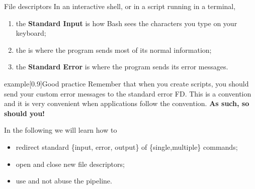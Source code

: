 \begin{frame}
\begin{center}
    \end{center}
\end{frame}
\begin{frame}{File descriptors}
    \vspace{-3mm}
    In an interactive shell, or in a script running in a terminal,
    \begin{enumerate}\addtocounter{enumi}{-1}
        \item the \textbf{Standard Input} is how Bash sees the characters you type on your keyboard;
        \item the  is where the program sends most of its normal information;
        \item the \alert{\textbf{Standard Error}} is where the program sends its error messages.
    \end{enumerate}
    \begin{varblock}{example}[0.9\textwidth]{Good practice}
        Remember that when you create scripts, you should send your custom error messages to the standard error FD.
        This is a convention and it is very convenient when applications follow the convention. \textbf{As such, so should you!}
    \end{varblock}
    \medskip
    In the following we will learn how to
    \begin{itemize}
        \item redirect standard \{input, error, output\} of \{single,multiple\} commands;
        \item open and close new file descriptors;
        \item use and not abuse the pipeline.
    \end{itemize}
\end{frame}

